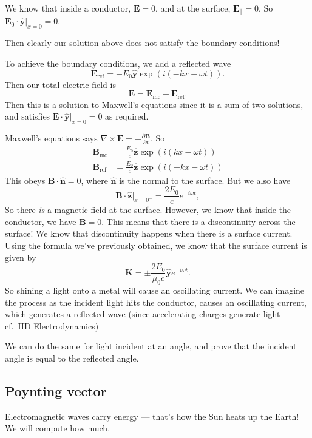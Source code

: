 \documentclass[a4paper]{article}
\begin{document}
We know that inside a conductor, $\mathbf{E} = 0$, and at the surface, $\mathbf{E}_{\parallel} = 0$. So $\mathbf{E}_0 \cdot \hat{\mathbf{y}}|_{x = 0} = 0$.

Then clearly our solution above does not satisfy the boundary conditions!

To achieve the boundary conditions, we add a reflected wave
\[
  \mathbf{E}_{\mathrm{ref}} = -E_0 \hat{\mathbf{y}} \exp(i(-kx - \omega t)).
\]
Then our total electric field is
\[
  \mathbf{E} = \mathbf{E}_{\mathrm{inc}} + \mathbf{E}_{\mathrm{ref}}.
\]
Then this is a solution to Maxwell's equations since it is a sum of two solutions, and satisfies $\mathbf{E}\cdot \hat{\mathbf{y}}|_{x = 0} = 0$ as required.

Maxwell's equations says $\nabla\times \mathbf{E} = -\frac{\partial \mathbf{B}}{\partial t}$. So
\begin{align*}
  \mathbf{B}_{\mathrm{inc}} &= \frac{E_0}{c}\hat{\mathbf{z}} \exp(i(kx - \omega t))\\
  \mathbf{B}_{\mathrm{ref}} &= \frac{E_0}{c}\hat{\mathbf{z}} \exp(i(-kx - \omega t))
\end{align*}
This obeys $\mathbf{B}\cdot \hat{\mathbf{n}} = 0$, where $\hat{\mathbf{n}}$ is the normal to the surface. But we also have
\[
  \mathbf{B}\cdot \hat{\mathbf{z}}|_{x = 0^-} = \frac{2E_0}{c}e^{-i\omega t},
\]
So there \emph{is} a magnetic field at the surface. However, we know that inside the conductor, we have $\mathbf{B} = 0$. This means that there is a discontinuity across the surface! We know that discontinuity happens when there is a surface current. Using the formula we've previously obtained, we know that the surface current is given by
\[
  \mathbf{K} = \pm\frac{2E_0}{\mu_0 c}\hat{\mathbf{y}} e^{-i \omega t}.
\]
So shining a light onto a metal will cause an oscillating current. We can imagine the process as the incident light hits the conductor, causes an oscillating current, which generates a reflected wave (since accelerating charges generate light --- cf.\ IID Electrodynamics)

We can do the same for light incident at an angle, and prove that the incident angle is equal to the reflected angle.

\subsection{Poynting vector}
Electromagnetic waves carry energy --- that's how the Sun heats up the Earth! We will compute how much.
\end{document}

